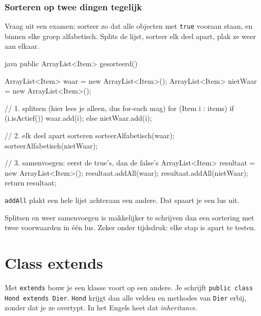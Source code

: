 \documentclass[a4paper,11pt]{article}
\begin{document}
\subsubsection{Sorteren op twee dingen tegelijk}

Vraag uit een examen: sorteer zo dat alle objecten met \texttt{true} vooraan
staan, en binnen elke groep alfabetisch. Splits de lijst, sorteer elk deel apart,
plak ze weer aan elkaar.

\begin{codeblock}{java}
    public ArrayList<Item> gesorteerd()
    {
        ArrayList<Item> waar = new ArrayList<Item>();
        ArrayList<Item> nietWaar = new ArrayList<Item>();

        // 1. splitsen (hier lees je alleen, dus for-each mag)
        for (Item i : items)
        {
            if (i.isActief())
            {
                waar.add(i);
            }
            else
            {
                nietWaar.add(i);
            }
        }

        // 2. elk deel apart sorteren
        sorteerAlfabetisch(waar);
        sorteerAlfabetisch(nietWaar);

        // 3. samenvoegen: eerst de true's, dan de false's
        ArrayList<Item> resultaat = new ArrayList<Item>();
        resultaat.addAll(waar);
        resultaat.addAll(nietWaar);
        return resultaat;
    }
\end{codeblock}

\texttt{addAll} plakt een hele lijst achteraan een andere. Dat spaart je een lus
uit.

\begin{examenbox}
Splitsen en weer samenvoegen is makkelijker te schrijven dan een sortering met
twee voorwaarden in \'e\'en lus. Zeker onder tijdsdruk: elke stap is apart te
testen.
\end{examenbox}


\section{Class extends}
Met \texttt{extends} bouw je een klasse voort op een andere. Je schrijft
\texttt{public class Hond extends Dier}. \texttt{Hond} krijgt dan alle velden en
methodes van \texttt{Dier} erbij, zonder dat je ze overtypt. In het Engels heet
dat \textit{inheritance}.
\end{document}
